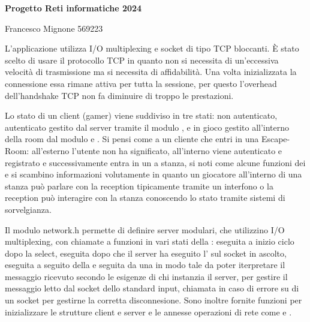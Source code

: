 \documentclass[12pt]{article}
\begin{document}
\begin{center}
    \Large
    \textbf{Progetto Reti informatiche 2024}
    
    \large
    Francesco Mignone 569223
\end{center}
L’applicazione utilizza I/O multiplexing e socket di tipo TCP bloccanti. È stato scelto di usare il protocollo TCP in quanto non si necessita di un’eccessiva velocità di trasmissione ma si necessita di affidabilità. Una volta inizializzata la connessione essa rimane attiva per tutta la sessione, per questo l'overhead dell'handshake TCP non fa diminuire di troppo le prestazioni.

Lo stato di un client (gamer) viene suddiviso in tre stati: non autenticato, autenticato gestito dal server tramite il modulo , e in gioco gestito all'interno della room dal modulo  e . Si pensi come a un cliente che entri in una Escape-Room: all'esterno l'utente non ha significato, all'interno viene autenticato e registrato e successivamente entra in un a stanza, si noti come alcune funzioni dei  e  si scambino informazioni volutamente in quanto un giocatore all'interno di una stanza può parlare con la reception tipicamente tramite un interfono o la reception può interagire con la stanza conoscendo lo stato tramite sistemi di sorvelgianza.

\vspace{0.1in}

Il modulo network.h permette di definire server modulari, che utilizzino I/O multiplexing, con chiamate a funzioni in vari stati della  :  eseguita a inizio ciclo dopo la select,  eseguita dopo che il server ha eseguito l' sul socket in ascolto,  eseguita a seguito della  e seguita da una  in modo tale da poter iterpretare il messaggio ricevuto secondo le esigenze di chi instanzia il server,  per gestire il messaggio letto dal socket dello standard input,  chiamata in caso di errore su di un socket per gestirne la corretta disconnesione. Sono inoltre fornite funzioni per inizializzare le strutture client e server e le annesse operazioni di rete come  e .

\vspace{0.1in}
\end{document}
